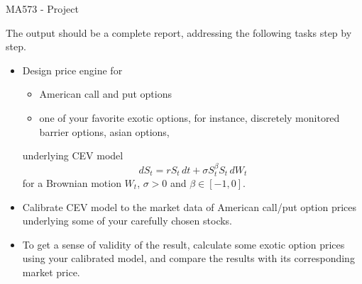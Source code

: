 \documentclass{article}
\begin{document}
\begin{center}
 MA573 - Project
\end{center}


The output should be a complete report, 
addressing the following tasks step by step.

\begin{itemize}
\item Design price engine for 
\begin{itemize}
  \item American call and put options 
  \item one of your favorite exotic options, for instance, 
  discretely monitored barrier options, asian options, 
\end{itemize}
underlying CEV model
	\[
	dS_t = rS_t \, dt + \sigma S_t^\beta S_t \, dW_t
	\]
	for a Brownian motion $W_t$, $\sigma > 0$ and $\beta \in [-1,0]$. 
\item Calibrate CEV model to the 
market data of American call/put option prices 
underlying some of your carefully chosen stocks.


\item 
To get a sense of validity of the result, calculate some exotic option prices 
using your calibrated model, and compare the results with its corresponding market price.

\end{itemize}
\end{document}
